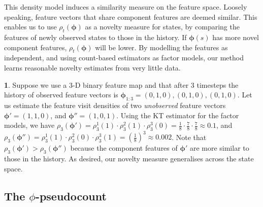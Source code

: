 \documentclass{article}
\theoremstyle{definition}
\theoremstyle{definition}
\newtheorem*{example*}{\protect\examplename}
\theoremstyle{plain}
\theoremstyle{plain}
\theoremstyle{plain}
\providecommand{\examplename}{Example}
\begin{document}
This density model induces a similarity measure on the feature space.
Loosely speaking, feature vectors that share component features are
deemed similar. This enables us to use $\rho_{t}(\bm{\phi})$ as a
novelty measure for states, by comparing the features of newly observed
states to those in the history. If $\bm{\phi}(s)$ has more novel
component features, $\rho_{t}(\bm{\phi})$ will be lower. By modelling
the features as independent, and using count-based estimators as factor
models, our method learns reasonable novelty estimates from very little
data. 
\begin{example*}
Suppose we use a 3-D binary feature map and that after 3 timesteps
the history of observed feature vectors is $\bm{\phi}_{1:3}=(0,1,0),(0,1,0),(0,1,0)$.
Let us estimate the feature visit densities of two \emph{unobserved}
feature vectors $\bm{\phi'}=(1,1,0)$, and $\bm{\phi}''=(1,0,1)$.
Using the KT estimator for the factor models, we have $\rho_{3}(\bm{\phi}')=\rho_{3}^{1}(1)\cdot\rho_{3}^{2}(1)\cdot\rho_{3}^{3}(0)=\frac{1}{8}\cdot\frac{7}{8}\cdot\frac{7}{8}\approx0.1$,
and $\rho_{3}(\bm{\phi}'')=\rho_{3}^{1}(1)\cdot\rho_{3}^{2}(0)\cdot\rho_{3}^{3}(1)=(\frac{1}{8})^{3}\approx0.002$.
Note that $\rho_{3}(\bm{\phi}')>\rho_{3}(\bm{\phi}'')$ because the
component features of $\bm{\phi}'$ are more similar to those in the
history. As desired, our novelty measure generalises across the state
space.
\end{example*}

\subsection{The $\phi$-pseudocount}
\end{document}
